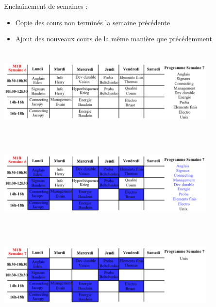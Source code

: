 \documentclass{beamer}
\begin{document}
\begin{frame}
Enchaînement de semaines :
\begin{itemize}
\item Copie des cours non terminés la semaine précédente
\item Ajout des nouveaux cours de la même manière que précédemment
\end{itemize}
\end{frame}

\begin{frame}
\begin{center}
\includegraphics [width=110mm, height=45mm]{Dessin3.png}
\end{center}
\end{frame}

\begin{frame}
\begin{center}
\includegraphics [width=110mm, height=45mm]{Dessin4.png}
\end{center}
\end{frame}

\begin{frame}
\begin{center}
\includegraphics [width=110mm, height=45mm]{Dessin5.png}
\end{center}
\end{frame}
\end{document}
